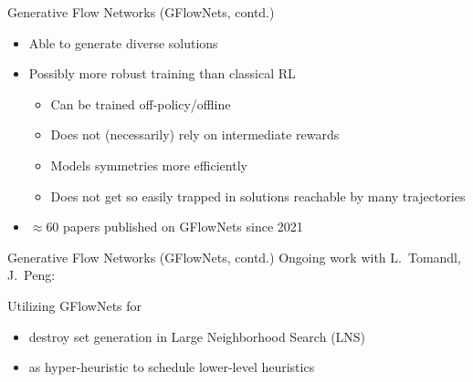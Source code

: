 \documentclass[aspectratio=1610]{beamer}
\newcommand{\important}[1]{{\color{green!60!black}#1}}
\begin{document}
\begin{frame}{Generative Flow Networks (GFlowNets, contd.)}
		\begin{itemize}
			\item Able to generate \important{diverse} solutions
			\item Possibly \important{more robust training} than classical RL
			\begin{itemize}
				\item Can be trained off-policy/offline
				\item Does not (necessarily) rely on intermediate rewards
				\item Models symmetries more efficiently
				\item Does not get so easily trapped in solutions reachable by many trajectories
			\end{itemize}
			\item $\approx 60$ papers published on GFlowNets since 2021
		\end{itemize}
	\end{frame}
	
	\begin{frame}{Generative Flow Networks (GFlowNets, contd.)}
	Ongoing work with L.~Tomandl, J.~Peng:
	
	\bigskip
	Utilizing GFlowNets for
	
	\medskip
	\begin{itemize}
		\itemsep2ex
		\item destroy set generation in Large Neighborhood Search (LNS)
		\item as hyper-heuristic to schedule lower-level heuristics
	\end{itemize}
\end{frame}


	
\end{document}
